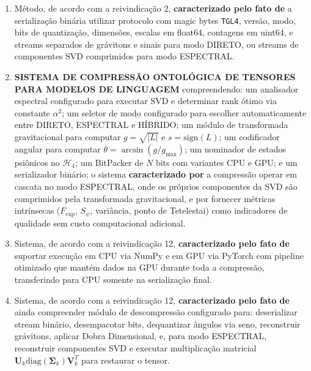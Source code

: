\documentclass[12pt,a4paper]{article}
\begin{document}
\begin{enumerate}[leftmargin=*, label=\textbf{\arabic*.}]
\item Método, de acordo com a reivindicação 2, \textbf{caracterizado pelo fato de} a serialização binária utilizar protocolo com magic bytes \texttt{TGL4}, versão, modo, bits de quantização, dimensões, escalas em float64, contagens em uint64, e streams separados de grávitons e sinais para modo DIRETO, ou streams de componentes SVD comprimidos para modo ESPECTRAL.

\item \textbf{SISTEMA DE COMPRESSÃO ONTOLÓGICA DE TENSORES PARA MODELOS DE LINGUAGEM} compreendendo: um analisador espectral configurado para executar SVD e determinar rank ótimo via constante $\alpha^2$; um seletor de modo configurado para escolher automaticamente entre DIRETO, ESPECTRAL e HÍBRIDO; um módulo de transformada gravitacional para computar $g = \sqrt{|L|}$ e $s = \text{sign}(L)$; um codificador angular para computar $\theta = \arcsin(g/g_{\max})$; um nominador de estados psiônicos no $\mathcal{H}_4$; um BitPacker de $N$ bits com variantes CPU e GPU; e um serializador binário; o sistema \textbf{caracterizado por} a compressão operar em cascata no modo ESPECTRAL, onde os próprios componentes da SVD são comprimidos pela transformada gravitacional, e por fornecer métricas intrínsecas ($F_{\text{exp}}$, $S_\psi$, variância, ponto de Tetelestai) como indicadores de qualidade sem custo computacional adicional.

\item Sistema, de acordo com a reivindicação 12, \textbf{caracterizado pelo fato de} suportar execução em CPU via NumPy e em GPU via PyTorch com pipeline otimizado que mantém dados na GPU durante toda a compressão, transferindo para CPU somente na serialização final.

\item Sistema, de acordo com a reivindicação 12, \textbf{caracterizado pelo fato de} ainda compreender módulo de descompressão configurado para: deserializar stream binário, desempacotar bits, dequantizar ângulos via seno, reconstruir grávitons, aplicar Dobra Dimensional, e, para modo ESPECTRAL, reconstruir componentes SVD e executar multiplicação matricial $\mathbf{U}_k \text{diag}(\boldsymbol{\Sigma}_k) \mathbf{V}_k^T$ para restaurar o tensor.

\end{enumerate}


\end{document}
